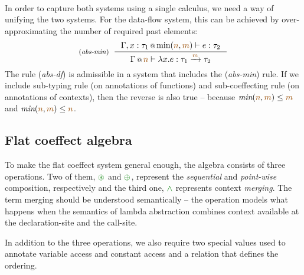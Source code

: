 ~

In order to capture both systems using a single calculus, we need a way of unifying the two
systems. For the data-flow system, this can be achieved by over-approximating the number of 
required past elements:
%
\begin{equation*}
\tyrule{abs-min}
  {\coctx{\Gamma, x:\tau_1}{\textnormal{min}(\aclrd{n}, \aclrd{m})} \vdash e : \tau_2}
  {\coctx{\Gamma}{\aclrd{n}} \vdash \lambda x.e : \tau_1 \xrightarrow{\aclrd{m}} \tau_2 }
\end{equation*}
%
The rule (\emph{abs-df}) is admissible in a system that includes the (\emph{abs-min}) rule. 
If we include sub-typing rule (on annotations of functions) and sub-coeffecting rule (on 
annotations of contexts), then the reverse is also true -- because 
$\textit{min}(\aclrd{n}, \aclrd{m}) \leq \aclrd{m}$ and $\textit{min}(\aclrd{n}, \aclrd{m}) \leq \aclrd{n}$.


\subsection{Flat coeffect algebra}
To make the flat coeffect system general enough, the algebra consists of three operations.
Two of them, $\cseq$ and $\cpar$, represent the \emph{sequential} and \emph{point-wise} composition, 
respectively and the third one, $\czip$ represents context \emph{merging}. The term merging should be 
understood semantically -- the operation models what happens when the semantics of lambda abstraction 
combines context available at the declaration-site and the call-site.

In addition to the three operations, we also require two special values used to annotate
variable access and constant access and a relation that defines the ordering.

